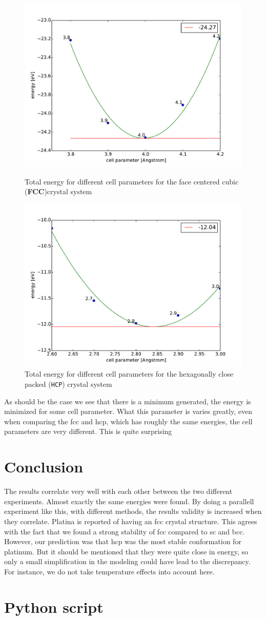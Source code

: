 \documentclass[a4paper,10pt]{article}
\begin{document}
\begin{figure}[H]
	\centering
	\includegraphics[width=0.7\linewidth]{fcc}
	\caption{Total energy for different cell parameters for the face centered cubic (\textbf{FCC})crystal system}
	\label{fig:fcc}
	
	\includegraphics[width=0.7\linewidth]{hcp}
	\caption{Total energy for different cell parameters for the hexagonally close packed (\texttt{HCP}) crystal system}
	\label{fig:hcp}
\end{figure}
As should be the case we see that there is a minimum generated, the energy is minimized for some cell parameter. What this parameter is varies greatly, even when comparing the fcc and hcp, which has roughly the same energies, the cell parameters are very different. This is quite surprising
\section{Conclusion}
The results correlate very well with each other between the two different experiments. Almost exactly the same energies were found. By doing a parallell experiment like this, with different methods, the results validity is increased when they correlate. Platina is reported of having an fcc crystal structure. This agrees with the fact that we found a strong stability of fcc compared to sc and bcc. However, our prediction was that hcp was the most stable conformation for platinum. But it should be mentioned that they were quite close in energy, so only a small simplification in the modeling could have lead to the discrepancy. For instance, we do not take temperature effects into account here.

\appendix
\section{Python script}

\end{document}
